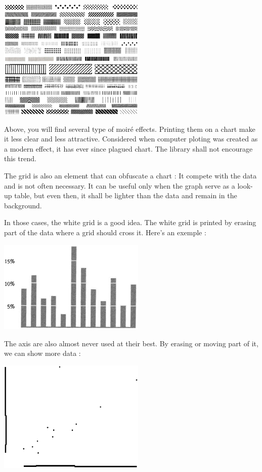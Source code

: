 \centerline{
\includegraphics[width=07cm]{./illustrations/annexes/moires.eps}
}
Above, you will find several type of moiré effects. Printing them on a chart make it less clear and less attractive.
 Considered when computer ploting was created as a modern effect, it has ever since plagued chart. The library shall not encourage this trend.

The grid is also an element that can obfuscate a chart : It compete with the data and is not often necessary.
 It can be useful only when the graph serve as a look-up table, but even then, it shall be lighter than the data and remain in the background. 

In those cases, the white grid is a good idea. The white grid is printed by erasing part of the data where a grid should cross it. Here's an exemple :
\centerline{
\includegraphics[width=07cm]{./illustrations/annexes/grilleblanche.eps}
}

The axis are also almost never used at their best. By erasing or moving part of it, we can show more data : 

\centerline{
\includegraphics[width=07cm]{./illustrations/annexes/axesmodernes.eps}
}

